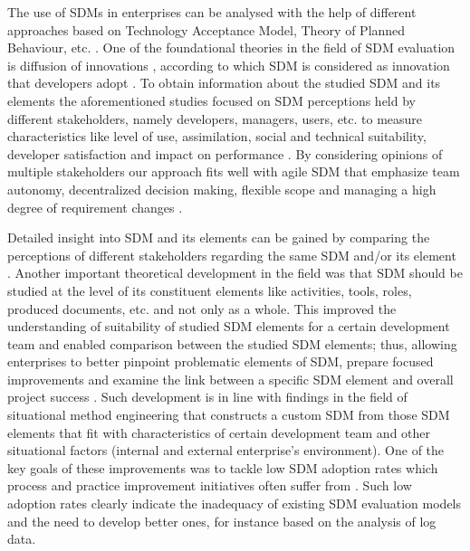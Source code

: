The use of SDMs in enterprises can be analysed with the help of different approaches based on Technology Acceptance Model, Theory of Planned Behaviour, etc. \citep{DBLP:journals/imds/Aboelmaged10,venkatesh2000theoretical,DBLP:journals/behaviourIT/WangLH13}. One of the foundational theories in the field of SDM evaluation is diffusion of innovations \citep{DBLP:books/daglib/0012785}, according to which SDM is considered as innovation that developers adopt \citep{DBLP:journals/iam/Gallivan03,DBLP:journals/infsof/GreenHC05,Huisman2002}. To obtain information about the studied SDM and its elements the aforementioned studies focused on SDM perceptions held by different stakeholders, namely developers, managers, users, etc. to measure characteristics like level of use, assimilation, social and technical suitability, developer satisfaction and impact on performance \citep{atkinson1999project,cooper1990information,DBLP:books/daglib/0012785,DBLP:journals/infsof/VavpoticB09,DBLP:journals/comsis/VavpoticH12,DBLP:journals/infsof/HodaNM11}. By considering opinions of multiple
stakeholders our approach fits well with agile SDM that emphasize team autonomy, decentralized
decision making, flexible scope and managing a high degree of requirement changes \citep{DBLP:journals/smr/ScottMKP21,DBLP:journals/software/Jorgensen19}.


Detailed insight into SDM and its elements can be gained by comparing the perceptions of different stakeholders regarding the same SDM and/or its element \citep{hovelja2015exploring}. 
Another important theoretical development in the field was that SDM should be studied at the level of its constituent elements like activities, tools, roles, produced documents, etc. and not only as a whole. This improved the understanding of suitability of studied SDM elements for a certain development team and enabled comparison between the studied SDM elements; thus, allowing enterprises to better pinpoint problematic elements of SDM, prepare focused improvements and examine the link between a specific SDM element and overall project success \citep{atkinson1999project,hovelja2015exploring}. Such development is in line with findings in the field of situational method engineering \citep{DBLP:journals/ejis/KarlssonA09,DBLP:conf/caise/RalyteDR03,gill2018scaling,Malinova2022} that constructs a custom SDM from those SDM elements that fit with characteristics of certain development team and other situational factors (internal and external enterprise’s environment).
One of the key goals of these improvements was to tackle low SDM
adoption rates which process and practice improvement initiatives often suffer from \citep{DBLP:conf/profes/FontdevilaGOP19}. Such low adoption rates clearly indicate the inadequacy of existing SDM evaluation models and the need to develop better ones, for instance based on the analysis of log data.

